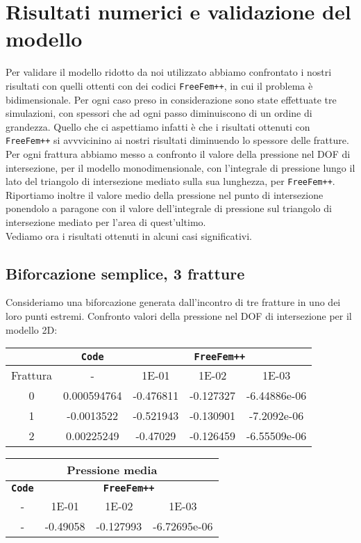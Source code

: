 \chapter{Risultati numerici e validazione del modello} 
Per validare il modello ridotto da noi utilizzato abbiamo confrontato i nostri risultati con quelli ottenti con dei codici \texttt{FreeFem++}, in cui il problema è bidimensionale. Per ogni caso preso in considerazione sono state effettuate tre simulazioni, con spessori che ad ogni passo diminuiscono di un ordine di grandezza. Quello che ci aspettiamo infatti è che i risultati ottenuti con \texttt{FreeFem++}  si avvvicinino ai nostri risultati diminuendo lo spessore delle fratture.\\
\noindent Per ogni frattura abbiamo messo a confronto il valore della pressione nel DOF di intersezione, per il modello monodimensionale, con l'integrale di pressione lungo il lato del triangolo di intersezione mediato sulla sua lunghezza, per \texttt{FreeFem++}.
Riportiamo inoltre il valore medio della pressione nel punto di intersezione ponendolo a paragone con il valore dell'integrale di pressione sul triangolo di intersezione mediato per l'area di quest'ultimo.\\
Vediamo ora i risultati ottenuti in alcuni casi significativi.
\section{Biforcazione semplice, 3 fratture}
Consideriamo una biforcazione generata dall'incontro di tre fratture in uno dei loro punti estremi.
Confronto valori della pressione nel DOF di intersezione per il modello 2D:\\
\begin{center}
\begin{tabular}{|c|c|c|c|c|}
\hline
 & \textbf{\texttt{Code}} & \multicolumn{3}{|c|}{\textbf{\texttt{FreeFem++}}} \\
\hline
\multicolumn{1}{|c|}{Frattura} & - &
\multicolumn{1}{|c|}{1E-01} & 1E-02 & 1E-03 \\
\hline
 0 & 0.000594764 & -0.476811 & -0.127327 & -6.44886e-06\\
 1 & -0.0013522 & -0.521943 & -0.130901 & -7.2092e-06\\
 2 & 0.00225249 & -0.47029 & -0.126459 & -6.55509e-06\\
\hline
\end{tabular}
\end{center}

\begin{center}
\begin{tabular}{|c|c|c|c|}
\hline
\multicolumn{4}{|c|}{Pressione media} \\
\hline
\textbf{\texttt{Code}} & \multicolumn{3}{|c|}{\textbf{\texttt{FreeFem++}}} \\
\hline
- & \multicolumn{1}{|c|}{1E-01} & 1E-02 & 1E-03 \\
\hline
   - & -0.49058 & -0.127993 & -6.72695e-06 \\
\hline
\end{tabular}
\end{center}



